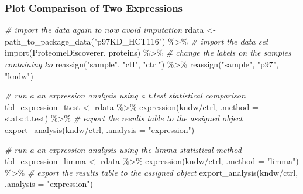\documentclass[
]{book}
\newenvironment{Shaded}{\begin{snugshade}}{\end{snugshade}}
\newcommand{\AttributeTok}[1]{\textcolor[rgb]{0.77,0.63,0.00}{#1}}
\newcommand{\CommentTok}[1]{\textcolor[rgb]{0.56,0.35,0.01}{\textit{#1}}}
\newcommand{\FunctionTok}[1]{\textcolor[rgb]{0.00,0.00,0.00}{#1}}
\newcommand{\NormalTok}[1]{#1}
\newcommand{\OtherTok}[1]{\textcolor[rgb]{0.56,0.35,0.01}{#1}}
\newcommand{\SpecialCharTok}[1]{\textcolor[rgb]{0.00,0.00,0.00}{#1}}
\newcommand{\StringTok}[1]{\textcolor[rgb]{0.31,0.60,0.02}{#1}}
\begin{document}
\hypertarget{plot-comparison-of-two-expressions}{%
\subsubsection{Plot Comparison of Two Expressions}\label{plot-comparison-of-two-expressions}}

\begin{Shaded}
\begin{Highlighting}[]
\CommentTok{\# import the data again to now avoid imputation}
\NormalTok{rdata }\OtherTok{\textless{}{-}} \FunctionTok{path\_to\_package\_data}\NormalTok{(}\StringTok{"p97KD\_HCT116"}\NormalTok{) }\SpecialCharTok{\%\textgreater{}\%}
  \CommentTok{\# import the data set}
  \FunctionTok{import}\NormalTok{(}\StringTok{\textquotesingle{}ProteomeDiscoverer\textquotesingle{}}\NormalTok{, }\StringTok{\textquotesingle{}proteins\textquotesingle{}}\NormalTok{) }\SpecialCharTok{\%\textgreater{}\%}
  \CommentTok{\# change the labels on the samples containing \textquotesingle{}ko\textquotesingle{}}
  \FunctionTok{reassign}\NormalTok{(}\StringTok{"sample"}\NormalTok{, }\StringTok{"ctl"}\NormalTok{, }\StringTok{"ctrl"}\NormalTok{) }\SpecialCharTok{\%\textgreater{}\%}
  \FunctionTok{reassign}\NormalTok{(}\StringTok{"sample"}\NormalTok{, }\StringTok{"p97"}\NormalTok{, }\StringTok{"kndw"}\NormalTok{)}

\CommentTok{\# run a an expression analysis using a t.test statistical comparison}
\NormalTok{tbl\_expression\_ttest }\OtherTok{\textless{}{-}}\NormalTok{ rdata }\SpecialCharTok{\%\textgreater{}\%}
  \FunctionTok{expression}\NormalTok{(kndw}\SpecialCharTok{/}\NormalTok{ctrl, }\AttributeTok{.method =}\NormalTok{ stats}\SpecialCharTok{::}\NormalTok{t.test) }\SpecialCharTok{\%\textgreater{}\%}
  \CommentTok{\# export the results table to the assigned object}
  \FunctionTok{export\_analysis}\NormalTok{(kndw}\SpecialCharTok{/}\NormalTok{ctrl, }\AttributeTok{.analysis =} \StringTok{"expression"}\NormalTok{)}

\CommentTok{\# run a an expression analysis using the limma statistical method}
\NormalTok{tbl\_expression\_limma }\OtherTok{\textless{}{-}}\NormalTok{ rdata }\SpecialCharTok{\%\textgreater{}\%}
  \FunctionTok{expression}\NormalTok{(kndw}\SpecialCharTok{/}\NormalTok{ctrl, }\AttributeTok{.method =} \StringTok{"limma"}\NormalTok{) }\SpecialCharTok{\%\textgreater{}\%}
  \CommentTok{\# export the results table to the assigned object}
  \FunctionTok{export\_analysis}\NormalTok{(kndw}\SpecialCharTok{/}\NormalTok{ctrl, }\AttributeTok{.analysis =} \StringTok{"expression"}\NormalTok{)}


\end{Highlighting}
\end{Shaded}
\end{document}
